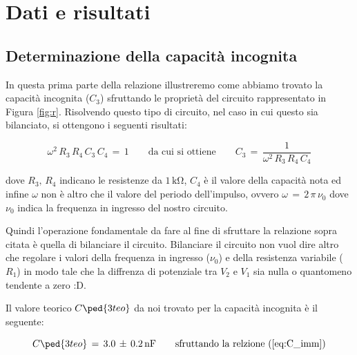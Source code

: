 \section*{Dati e risultati}

\subsection*{Determinazione della capacità incognita}

In questa prima parte della relazione illustreremo come abbiamo trovato la capacità incognita ($C_3$) sfruttando le proprietà del circuito rappresentato in Figura \ref{fig:r}.
Risolvendo questo tipo di circuito, nel caso in cui questo sia bilanciato, si ottengono i seguenti risultati:

\begin{equation}
	\omega^2\,R_3\,R_4\,C_3\,C_4 \,=\, 1 \qquad \text{da cui si ottiene} \qquad C_3 \,=\, \frac{1}{\omega^2\,R_3\,R_4\,C_4}
	\label{eq:C_imm}
\end{equation}

dove $R_3,\,R_4$ indicano le resistenze da $1\,\si{\kilo\ohm}$, $C_4$ è il valore della capacità nota ed infine $\omega$ non è altro che il valore del periodo dell'impulso, ovvero $\omega \,=\, 2\,\pi\,\nu_0$ dove $\nu_0$ indica la frequenza in ingresso del nostro circuito.

Quindi l'operazione fondamentale da fare al fine di sfruttare la relazione sopra citata è quella di bilanciare il circuito. Bilanciare il circuito non vuol dire altro che regolare i valori della frequenza in ingresso ($\nu_0$) e della resistenza variabile ($R_1$) in modo tale che la diffrenza di potenziale tra $V_2$ e $V_1$ sia nulla o quantomeno tendente a zero :D.

Il valore teorico $C\ped{3teo}$ da noi trovato per la capacità incognita è il seguente:

\begin{equation}
	C\ped{3teo} \,=\, 3.0 \,\pm\, 0.2 \,\si{\nano\farad}  \qquad \text{sfruttando la relzione (\ref{eq:C_imm})}
	\label{eq:C_teo_imm}
\end{equation}

